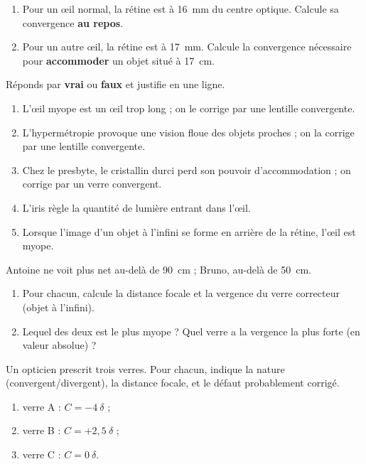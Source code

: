 \documentclass[11pt,a4paper]{article}
\begin{document}

\begin{exo}
\begin{enumerate}[label=\alph*)]
  \item Pour un \oe il normal, la rétine est à \qty{16}{\mm} du centre optique. Calcule sa convergence
        \textbf{au repos}.
  \item Pour un autre \oe il, la rétine est à \qty{17}{\mm}. Calcule la convergence nécessaire pour
        \textbf{accommoder} un objet situé à \qty{17}{\cm}.
\end{enumerate}
\end{exo}

\begin{exo}
Réponds par \textbf{vrai} ou \textbf{faux} et justifie en une ligne.
\begin{enumerate}[label=\alph*)]
  \item L'\oe il myope est un \oe il trop long ; on le corrige par une lentille convergente.
  \item L'hypermétropie provoque une vision floue des objets proches ; on la corrige par une
        lentille convergente.
  \item Chez le presbyte, le cristallin durci perd son pouvoir d'accommodation ; on corrige par un
        verre convergent.
  \item L'iris règle la quantité de lumière entrant dans l'\oe il.
  \item Lorsque l'image d'un objet à l'infini se forme en arrière de la rétine, l'\oe il est myope.
\end{enumerate}
\end{exo}

\begin{exo}
Antoine ne voit plus net au-delà de \qty{90}{\cm} ; Bruno, au-delà de \qty{50}{\cm}.
\begin{enumerate}[label=\alph*)]
  \item Pour chacun, calcule la distance focale et la vergence du verre correcteur (objet à l'infini).
  \item Lequel des deux est le plus myope ? Quel verre a la vergence la plus forte (en valeur
        absolue) ?
\end{enumerate}
\end{exo}

\begin{exo}
Un opticien prescrit trois verres. Pour chacun, indique la nature (convergent/divergent), la distance
focale, et le défaut probablement corrigé.
\begin{enumerate}[label=\alph*)]
  \item verre A : $C=-4~\delta$ ;
  \item verre B : $C=+2{,}5~\delta$ ;
  \item verre C : $C=0~\delta$.
\end{enumerate}
\end{exo}
\end{document}
